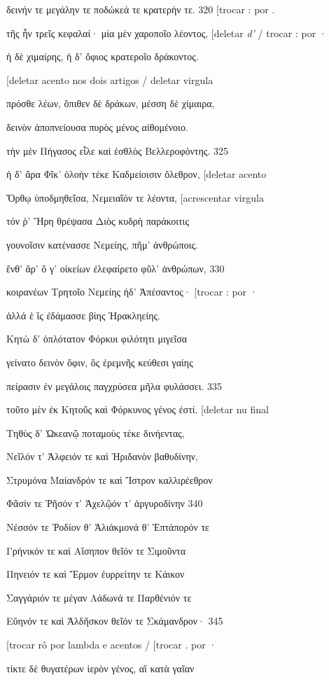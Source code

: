 δεινήν τε μεγάλην τε ποδώκεά τε κρατερήν τε. 320 {[}trocar : por .

τῆς ἦν τρεῖς κεφαλαί· μία μὲν χαροποῖο λέοντος, {[}deletar \emph{d'} /
trocar : por ·

ἡ δὲ χιμαίρης, ἡ δ' ὄφιος κρατεροῖο δράκοντος.

{[}deletar acento nos dois artigos / deletar virgula

πρόσθε λέων, ὄπιθεν δὲ δράκων, μέσση δὲ χίμαιρα,

δεινὸν ἀποπνείουσα πυρὸς μένος αἰθομένοιο.

τὴν μὲν Πήγασος εἷλε καὶ ἐσθλὸς Βελλεροφόντης. 325

ἡ δ' ἄρα Φῖκ' ὀλοὴν τέκε Καδμείοισιν ὄλεθρον, {[}deletar acento

Ὄρθῳ ὑποδμηθεῖσα, Νεμειαῖόν τε λέοντα, {[}acrescentar virgula

τόν ῥ' Ἥρη θρέψασα Διὸς κυδρὴ παράκοιτις

γουνοῖσιν κατένασσε Νεμείης, πῆμ' ἀνθρώποις.

ἔνθ' ἄρ' ὅ γ' οἰκείων ἐλεφαίρετο φῦλ' ἀνθρώπων, 330

κοιρανέων Τρητοῖο Νεμείης ἠδ' Ἀπέσαντος· {[}trocar : por ·

ἀλλά ἑ ἲς ἐδάμασσε βίης Ἡρακληείης.

Κητὼ δ' ὁπλότατον Φόρκυι φιλότητι μιγεῖσα

γείνατο δεινὸν ὄφιν, ὃς ἐρεμνῆς κεύθεσι γαίης

πείρασιν ἐν μεγάλοις παγχρύσεα μῆλα φυλάσσει. 335

τοῦτο μὲν ἐκ Κητοῦς καὶ Φόρκυνος γένος ἐστί. {[}deletar nu final

Τηθὺς δ' Ὠκεανῷ ποταμοὺς τέκε δινήεντας,

Νεῖλόν τ' Ἀλφειόν τε καὶ Ἠριδανὸν βαθυδίνην,

Στρυμόνα Μαίανδρόν τε καὶ Ἴστρον καλλιρέεθρον

Φᾶσίν τε Ῥῆσόν τ' Ἀχελῷόν τ' ἀργυροδίνην 340

Νέσσόν τε Ῥοδίον θ' Ἁλιάκμονά θ' Ἑπτάπορόν τε

Γρήνικόν τε καὶ Αἴσηπον θεῖόν τε Σιμοῦντα

Πηνειόν τε καὶ Ἕρμον ἐυρρείτην τε Κάικον

Σαγγάριόν τε μέγαν Λάδωνά τε Παρθένιόν τε

Εὔηνόν τε καὶ Ἀλδῆσκον θεῖόν τε Σκάμανδρον· 345

{[}trocar rô por lambda e acentos / {[}trocar . por ·

τίκτε δὲ θυγατέρων ἱερὸν γένος, αἳ κατὰ γαῖαν

